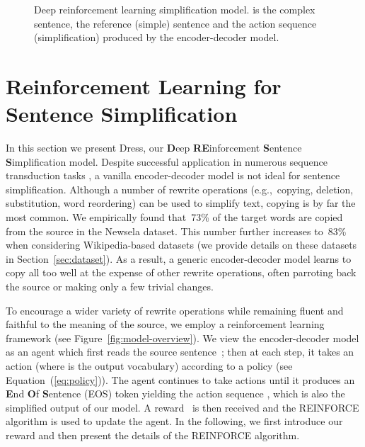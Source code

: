 \documentclass[11pt,letterpaper]{article}
\begin{document}
\begin{figure*}
{
		
	}\caption{\label{fig:model-overview} Deep reinforcement
		learning simplification model.  is the complex sentence,
		 the reference (simple) sentence and
		 the action
		sequence (simplification) produced by the
		encoder-decoder model.}
	\label{fig:sys}
\end{figure*}



\section{Reinforcement Learning for Sentence Simplification}
\label{sec:rf}
In this section we present {\sc Dress}, our {\bf D}eep {\bf
  RE}inforcement {\bf S}entence {\bf S}implification model.  Despite
successful application in numerous sequence transduction tasks
\cite{jean2015montreal,chopra-auli-rush:2016:N16-1,xu2015show}, a
vanilla encoder-decoder model is not ideal for sentence
simplification. Although a number of rewrite operations
(e.g.,~copying, deletion, substitution, word reordering) can be used
to simplify text, copying is by far the most common. We empirically
found that~73\% of the target words are copied from the source in the
Newsela dataset. This number further increases to~83\% when
considering Wikipedia-based datasets (we provide details on these
datasets in Section~\ref{sec:dataset}). As a result, a generic
encoder-decoder model learns to copy all too well at the expense of
other rewrite operations, often parroting back the source or making
only a few trivial changes.

To encourage a wider variety of rewrite operations while remaining
fluent and faithful to the meaning of the source, we employ a
reinforcement learning framework (see
Figure~\ref{fig:model-overview}).  We view the encoder-decoder model
as an agent which first reads the source sentence~; then at each
step, it takes an action  (where  is the output
vocabulary) according to a policy
 (see
Equation~(\ref{eq:policy})). The agent continues to take actions until
it produces an \textbf{E}nd {\bf O}f {\bf S}entence (EOS) token
yielding the action sequence
, which is
also the simplified output of our model. A reward~ is then received
and the REINFORCE algorithm \cite{williams1992simple} is used to
update the agent.  In the following, we first introduce our reward and
then present the details of the REINFORCE algorithm.
\end{document}
